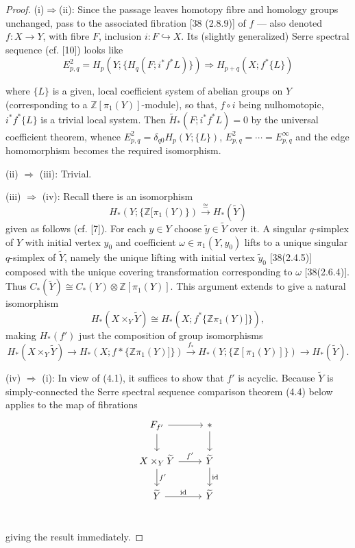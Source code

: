 \documentclass[openany,leqno]{book}  %
\newcommand{\id}{\mathrm{id}} %
\newcommand{\Z}{\mathbb{Z}}
\begin{document}
\begin{proof}
(i)$\Rightarrow$(ii): Since the passage leaves homotopy fibre and homology groups unchanged, pass to the associated fibration [38 (2.8.9)] of $f$ --- also denoted $f\colon   X \longrightarrow Y$, with fibre $F$, inclusion $i\colon   F\hookrightarrow X$. Its (slightly generalized) Serre spectral sequence (cf. [10]) looks like
\[E_{p,q}^2 = H_p(Y;\{H_q(F;i^*f^*L)\}) \Longrightarrow  H_{p+q}(X;f^*\{L\})\]

where $\{L\}$ is a given, local coefficient system of abelian groups on $Y$ (corresponding to a $\Z[\pi_1(Y)]$-module), so that, $f\circ i$ being nulhomotopic, $i^*f^*\{L\}$ is a trivial local system. Then $\widetilde{H}_*(F; i^*f^*L) = 0$ by the universal coefficient theorem, whence $E^2_{p,q} = \delta_{q0} H_p(Y;\{L\})$,
$E^2_{p,q} = \cdots = E^{\infty}_{p,q}$ and the edge homomorphism becomes the required isomorphism.

(ii) $\Rightarrow$ (iii): Trivial.

(iii) $\Rightarrow$ (iv): Recall there is an isomorphism
\[H_*(Y;\{\Z[\pi_1(Y)\}) \overset{\cong}{\longrightarrow} H_*(\widetilde{Y})\]
given as follows (cf. [7]). For each $y\in Y$ choose $\widetilde{y}\in \widetilde{Y}$ over it. A singular $q$-simplex of $Y$ with initial vertex $y_0$ and coefficient $\omega \in \pi_1(Y,y_0)$ lifts to a unique singular $q$-simplex of $\widetilde{Y}$, namely the unique lifting with initial vertex $\widetilde{y}_0$ [38(2.4.5)] composed with the unique covering transformation corresponding to $\omega$ [38(2.6.4)]. Thus $C_*(\widetilde{Y}) \cong C_*(Y)\otimes \Z[\pi_1(Y)]$. This argument extends to give a natural isomorphism
\[H_*(X\times_Y \widetilde{Y}) \cong H_*(X;f^*\{\Z\pi_1(Y)]\}),\]
 making $H_*(f')$ just the composition of group isomorphisms
\[H_*(X\times_Y \widetilde{Y}) \longrightarrow H_*(X;f*\{\Z \pi_1(Y)]\})\overset{f_*}\longrightarrow  H_*(Y;\{\Z[\pi_1(Y)]\}) \longrightarrow H_*(\widetilde{Y}).\]

(iv) $\Rightarrow$ (i): In view of (4.1), it suffices to show that $f'$ is acyclic. Because $\widetilde{Y}$ is simply-connected the Serre spectral sequence comparison theorem (4.4) below applies to the map of fibrations
\[\begin{tikzcd}
F_{f'} \arrow{r} \arrow{d} & * \arrow{d}\\
X\times_Y \widetilde{Y} \arrow{r}{f'} \arrow{d}{f'}& \widetilde{Y} \arrow{d}{\id}\\
\widetilde{Y} \arrow{r}{\id} &\widetilde{Y}\\
\end{tikzcd}\]

giving the result immediately.
\end{proof}
\end{document}
